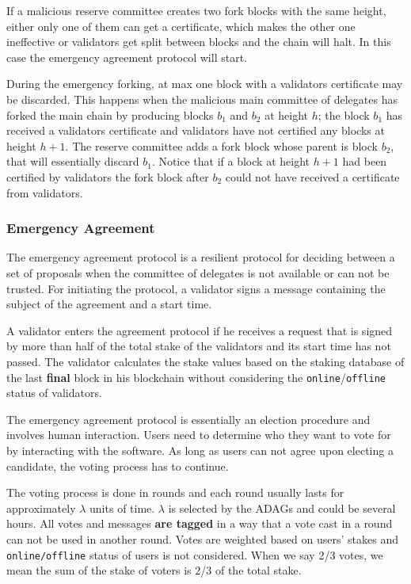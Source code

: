 If a malicious reserve committee creates two fork blocks with the same height, either only one of
them can get a certificate, which makes the other one ineffective or validators get split between blocks
and the chain will halt. In this case the emergency agreement protocol will start.

During the emergency forking, at max one block with a validators certificate may be discarded. This happens when
the malicious main committee of delegates has forked the main chain by producing blocks $b_1$ and $b_2$ at height
$h$; the block $b_1$ has received a validators certificate and validators have not certified any blocks at height $h+1$.
The reserve committee adds a fork block whose parent is block $b_2$, that will essentially discard $b_1$. Notice
that if a block at height $h+1$ had been certified by validators the fork block after $b_2$ could not have received a
certificate from validators.

\subsubsection{Emergency Agreement}

The emergency agreement protocol is a resilient protocol for deciding between a set of proposals when the committee of
delegates is not available or can not be trusted. For initiating the protocol, a validator signs a message containing
the subject of the agreement and a start time.

A validator enters the agreement protocol if he
receives a request that is signed by more than half of the total stake
of the validators and its start time has not passed. The validator calculates
the stake values based on the staking database of the last \textbf{final} block in his blockchain without
considering the \texttt{online}/\texttt{offline} status of validators.

The emergency agreement protocol is essentially an election procedure and involves human interaction. Users need to
determine who they want to vote for by interacting with the software. As long as users can not agree upon electing a
candidate, the voting process has to continue.

The voting process is done in rounds and each round usually lasts for approximately $\lambda$ units of time.
$\lambda$ is selected by the ADAGs and could be several hours. All votes and messages \textbf{are tagged} in a way
that a vote cast in a round can not be used in another round. Votes are weighted based on users' stakes and
\texttt{online/offline} status of users is not considered. When we say 2/3 votes, we mean the sum of the stake of
voters is 2/3 of the total stake.

